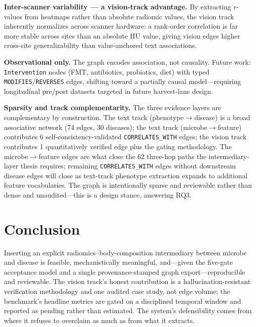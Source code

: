 \documentclass[10pt,twocolumn,letterpaper]{article}
\begin{document}
\noindent\textbf{Inter-scanner variability --- a vision-track advantage.} By
extracting $r$-values from heatmaps rather than absolute radiomic values, the
vision track inherently normalizes across scanner hardware: a rank-order
correlation is far more stable across sites than an absolute HU value, giving
vision edges higher cross-site generalizability than value-anchored text
associations.

\noindent\textbf{Observational only.} The graph encodes association, not
causality. Future work: \texttt{Intervention} nodes (FMT, antibiotics,
probiotics, diet) with typed \texttt{MODIFIES}/\texttt{REVERSES} edges,
shifting toward a partially causal model---requiring longitudinal
pre/post datasets targeted in future harvest-lane design.

\noindent\textbf{Sparsity and track complementarity.} The three evidence
layers are complementary by construction. The text track
(phenotype$\rightarrow$disease) is a broad associative network (74 edges, 30
diseases); the text track (microbe$\rightarrow$feature) contributes 6
self-consistency-validated \texttt{CORRELATES\_WITH} edges; the vision track
contributes 1 quantitatively verified edge plus the gating methodology. The
microbe$\rightarrow$feature edges are what close the 62 three-hop paths the
intermediary-layer thesis requires; remaining \texttt{CORRELATES\_WITH} edges
without downstream disease edges will close as text-track phenotype
extraction expands to additional feature vocabularies. The graph is
intentionally sparse and reviewable rather than dense and unaudited---this is
a design stance, answering RQ3.

\section{Conclusion}

Inserting an explicit radiomics--body-composition intermediary between
microbe and disease is feasible, mechanistically meaningful, and---given the
five-gate acceptance model and a single provenance-stamped graph
export---reproducible and reviewable. The vision track's honest contribution
is a hallucination-resistant verification methodology and one audited
case study, not edge volume; the benchmark's headline metrics are gated on a
disciplined temporal window and reported as pending rather than estimated.
The system's defensibility comes from where it refuses to overclaim as much
as from what it extracts.
\end{document}
